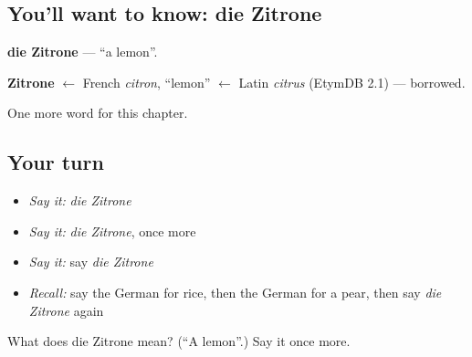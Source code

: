\subsection*{You'll want to know: die Zitrone}
\textbf{die Zitrone} — \textquotedblleft{}a lemon\textquotedblright{}.

\begin{cousinweb}
\textbf{Zitrone} $\leftarrow$ French \emph{citron}, \textquotedblleft{}lemon\textquotedblright{} $\leftarrow$ Latin \emph{citrus} (EtymDB 2.1) — borrowed.
\end{cousinweb}

\begin{grammarlens}[title={What you've built}]
One more word for this chapter.
\end{grammarlens}

\subsection*{Your turn}
\begin{itemize}
\raggedright
  \item \emph{Say it:} \emph{die Zitrone}
  \item \emph{Say it:} \emph{die Zitrone}, once more
  \item \emph{Say it:} say \emph{die Zitrone}
  \item \emph{Recall:} say the German for rice, then the German for a pear, then say \emph{die Zitrone} again
\end{itemize}

\begin{tcolorbox}[breakable,colback=teal!4,colframe=teal!35!black,title={Before you move on}]
What does die Zitrone mean? (\textquotedblleft{}A lemon\textquotedblright{}.) Say it once more.
\end{tcolorbox}
